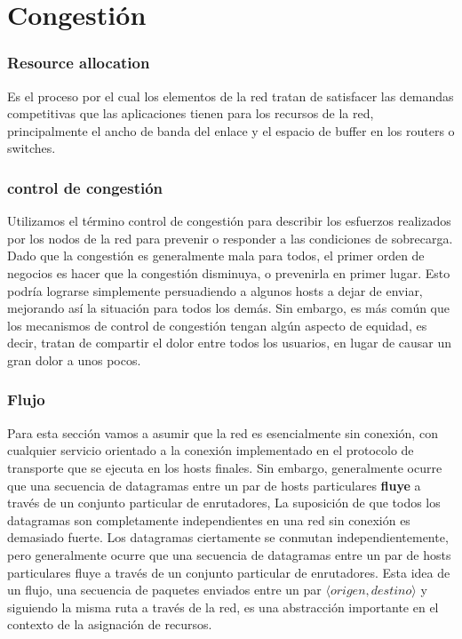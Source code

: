 \section{Congestión}
\subsubsection*{Resource allocation} Es el proceso por el cual los elementos de la red tratan de satisfacer las demandas competitivas que las aplicaciones tienen para los recursos de la red, principalmente el ancho de banda del enlace y el espacio de buffer en los routers o switches.

\subsubsection*{control de congestión} 
Utilizamos el término control de congestión para describir los esfuerzos realizados por los nodos de la red para prevenir o responder a las condiciones de sobrecarga. Dado que la congestión es generalmente mala para todos, el primer orden de negocios es hacer que la congestión disminuya, o prevenirla en primer lugar. Esto podría lograrse simplemente persuadiendo a algunos hosts a dejar de enviar, mejorando así la situación para todos los demás. Sin embargo, es más común que los mecanismos de control de congestión tengan algún aspecto de equidad, es decir, tratan de compartir el dolor entre todos los usuarios, en lugar de causar un gran dolor a unos pocos. 

\subsubsection*{Flujo} 
Para esta sección vamos a asumir que la red es esencialmente sin conexión, con cualquier servicio orientado a la conexión implementado en el protocolo de transporte que se ejecuta en los hosts finales. Sin embargo, generalmente ocurre que una secuencia de datagramas entre un par de hosts particulares \textbf{fluye} a través de un conjunto particular de enrutadores,  La suposición de que todos los datagramas son completamente independientes en una red sin conexión es demasiado fuerte. Los datagramas ciertamente se conmutan independientemente, pero generalmente ocurre que una secuencia de datagramas entre un par de hosts particulares fluye a través de un conjunto particular de enrutadores. Esta idea de un flujo, una secuencia de paquetes enviados entre un par \(\langle origen , destino\rangle\) y siguiendo la misma ruta a través de la red, es una abstracción importante en el contexto de la asignación de recursos.


